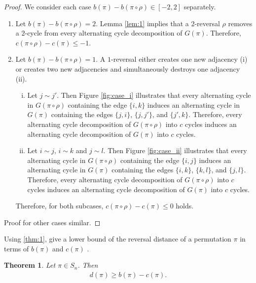 \documentclass[11pt,DIV=11]{scrartcl}
\newtheorem{theorem}{Theorem}[section]
\theoremstyle{definition}
\theoremstyle{remark}
\begin{document}
\begin{proof}
We consider each case $b(\pi) - b(\pi \circ \rho) \in [-2,2]$ separately.
\begin{enumerate}
    \item Let $b(\pi) - b(\pi \circ \rho) = 2$. Lemma \ref{lem:1} implies that a $2$-reversal $\rho$ removes a $2$-cycle from every alternating cycle decomposition of $G(\pi)$. Therefore, $c(\pi \circ \rho) - c(\pi) \leq -1$.
    \item Let $b(\pi) - b(\pi \circ \rho) = 1$. A $1$-reversal either creates one new adjacency (i) or creates two new adjacencies and simultaneously destroys one adjacency (ii).
        \begin{enumerate}[(i)]
            \item Let $j \sim j'$. Then Figure \ref{fig:case_i} illustrates that every alternating cycle in $G(\pi \circ \rho)$ containing the edge $\{i,k\}$ induces an alternating cycle in $G(\pi)$ containing the edges $\{j,i\}$, $\{j,j'\}$, and $\{j',k\}$. Therefore, every alternating cycle decomposition of $G(\pi \circ \rho)$ into $c$ cycles induces an alternating cycle decomposition of $G(\pi)$ into $c$ cycles.
            \item Let $i \sim j$, $i \sim k$ and $j \sim l$. Then Figure \ref{fig:case_ii} illustrates that every alternating cycle in $G(\pi \circ \rho)$ containing the edge $\{i,j\}$ induces an alternating cycle in $G(\pi)$ containing the edges $\{i,k\}$, $\{k,l\}$, and $\{j,l\}$. Therefore, every alternating cycle decomposition of $G(\pi \circ \rho)$ into $c$ cycles induces an alternating cycle decomposition of $G(\pi)$ into $c$ cycles.
        \end{enumerate}
    Therefore, for both subcases, $c(\pi \circ \rho) - c(\pi) \leq 0$ holds.
\end{enumerate}
Proof for other cases similar.
\end{proof}

Using \ref{thm:1}, \citeauthor*{Bafna1996} give a lower bound of the reversal distance of a permutation $\pi$ in terms of $b(\pi)$ and $c(\pi)$ \cite{Bafna1996}.

\begin{theorem}
\label{thm:2}
Let $\pi \in S_n$. Then
\begin{align*}
    d(\pi) \geq b(\pi) - c(\pi).
\end{align*}
\end{theorem}
\end{document}
